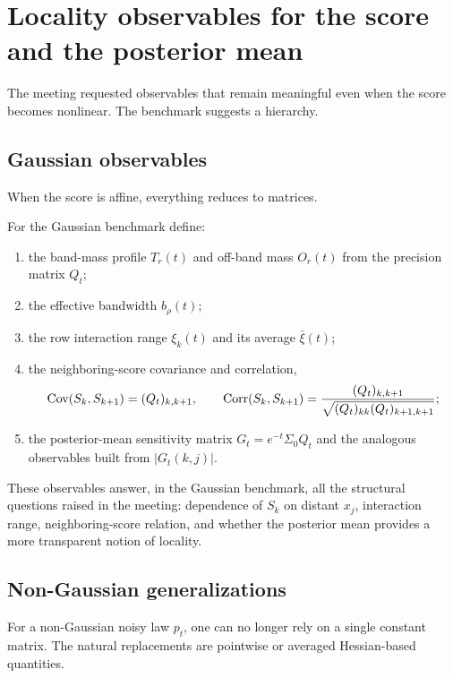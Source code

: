 \documentclass[11pt]{article}
\begin{document}
\section{Locality observables for the score and the posterior mean}

The meeting requested observables that remain meaningful even when the score becomes nonlinear. The benchmark suggests a hierarchy.

\subsection{Gaussian observables}

When the score is affine, everything reduces to matrices.

\begin{definition}
For the Gaussian benchmark define:
\begin{enumerate}[label=(\roman*),leftmargin=1.2cm]
\item the band-mass profile $T_r(t)$ and off-band mass $O_r(t)$ from the precision matrix $Q_t$;
\item the effective bandwidth $b_\rho(t)$;
\item the row interaction range $\xi_k(t)$ and its average $\bar\xi(t)$;
\item the neighboring-score covariance and correlation,
\begin{equation}
 \operatorname{Cov}(S_k,S_{k+1})=(Q_t)_{k,k+1},
 \qquad
 \operatorname{Corr}(S_k,S_{k+1})=\frac{(Q_t)_{k,k+1}}{\sqrt{(Q_t)_{kk}(Q_t)_{k+1,k+1}}};
\end{equation}
\item the posterior-mean sensitivity matrix $G_t=e^{-t}\Sigma_0Q_t$ and the analogous observables built from $|G_t(k,j)|$.
\end{enumerate}
\end{definition}

These observables answer, in the Gaussian benchmark, all the structural questions raised in the meeting: dependence of $S_k$ on distant $x_j$, interaction range, neighboring-score relation, and whether the posterior mean provides a more transparent notion of locality.

\subsection{Non-Gaussian generalizations}

For a non-Gaussian noisy law $p_t$, one can no longer rely on a single constant matrix. The natural replacements are pointwise or averaged Hessian-based quantities.
\end{document}
